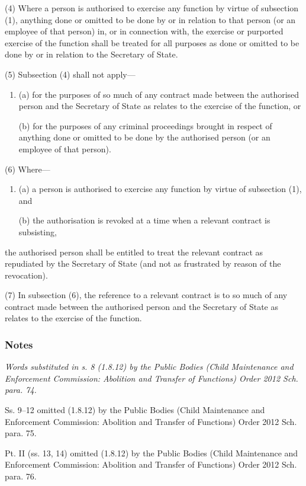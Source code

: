 \documentclass[a4paper]{article}
\newcommand\amendment[1]{\subsubsection*{Notes}{\itshape\frenchspacing\footnotesize #1 \par}}
\begin{document}
(4) Where a person is authorised to exercise any function by virtue of subsection (1), anything done or omitted to be done by or in relation to that person (or an employee of that person) in, or in connection with, the exercise or purported exercise of the function shall be treated for all purposes as done or omitted to be done by or in relation to the Secretary of State.

(5) Subsection (4) shall not apply—
\begin{enumerate}\item[]
(a) for the purposes of so much of any contract made between the authorised person and the Secretary of State as relates to the exercise of the function, or

(b) for the purposes of any criminal proceedings brought in respect of anything done or omitted to be done by the authorised person (or an employee of that person).
\end{enumerate}

(6) Where—
\begin{enumerate}\item[]
(a) a person is authorised to exercise any function by virtue of subsection (1), and

(b) the authorisation is revoked at a time when a relevant contract is subsisting,
\end{enumerate}
the authorised person shall be entitled to treat the relevant contract as repudiated by the Secretary of State (and not as frustrated by reason of the revocation).

(7) In subsection (6), the reference to a relevant contract is to so much of any contract made between the authorised person and the Secretary of State as relates to the exercise of the function.

\amendment{
Words substituted in s. 8 (1.8.12) by the Public Bodies (Child Maintenance and Enforcement Commission: Abolition and Transfer of Functions) Order 2012 Sch. para. 74.

\medskip

Ss. 9--12 omitted (1.8.12) by the Public Bodies (Child Maintenance and Enforcement Commission: Abolition and Transfer of Functions) Order 2012 Sch. para. 75.

\medskip

Pt. II (ss. 13, 14) omitted (1.8.12) by the Public Bodies (Child Maintenance and Enforcement Commission: Abolition and Transfer of Functions) Order 2012 Sch. para. 76.
}
\end{document}

